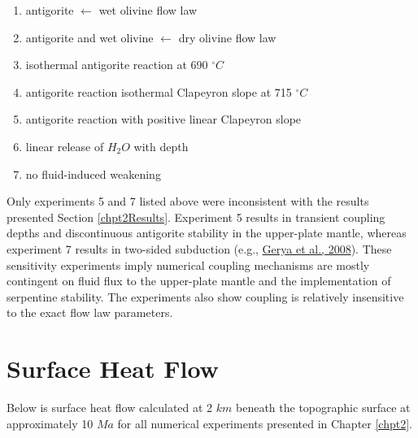 \begin{enumerate}
\def\labelenumi{\arabic{enumi}.}
\tightlist
\item
  antigorite \(\leftarrow\) wet olivine flow law
\item
  antigorite and wet olivine \(\leftarrow\) dry olivine flow law
\item
  isothermal antigorite reaction at 690 \(^{\circ}C\)
\item
  antigorite reaction isothermal Clapeyron slope at 715 \(^{\circ}C\)
\item
  antigorite reaction with positive linear Clapeyron slope
\item
  linear release of \(H_{2}O\) with depth
\item
  no fluid-induced weakening
\end{enumerate}

Only experiments 5 and 7 listed above were inconsistent with the results presented Section \ref{chpt2Results}. Experiment 5 results in transient coupling depths and discontinuous antigorite stability in the upper-plate mantle, whereas experiment 7 results in two-sided subduction (e.g., \protect\hyperlink{ref-gerya2008}{Gerya et al., 2008}). These sensitivity experiments imply numerical coupling mechanisms are mostly contingent on fluid flux to the upper-plate mantle and the implementation of serpentine stability. The experiments also show coupling is relatively insensitive to the exact flow law parameters.

\hypertarget{surface-heat-flow-1}{%
\section{Surface Heat Flow}\label{surface-heat-flow-1}}

Below is surface heat flow calculated at 2 \(km\) beneath the topographic surface at approximately 10 \(Ma\) for all numerical experiments presented in Chapter \ref{chpt2}.

